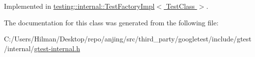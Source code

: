 Implemented in \hyperlink{classtesting_1_1internal_1_1_test_factory_impl_a8860c89bdb06450a5d5e8137ebd9d775}{testing\+::internal\+::\+Test\+Factory\+Impl$<$ Test\+Class $>$}.



The documentation for this class was generated from the following file\+:\begin{DoxyCompactItemize}
\item 
C\+:/\+Users/\+Hilman/\+Desktop/repo/anjing/src/third\+\_\+party/googletest/include/gtest/internal/\hyperlink{gtest-internal_8h}{gtest-\/internal.\+h}\end{DoxyCompactItemize}

